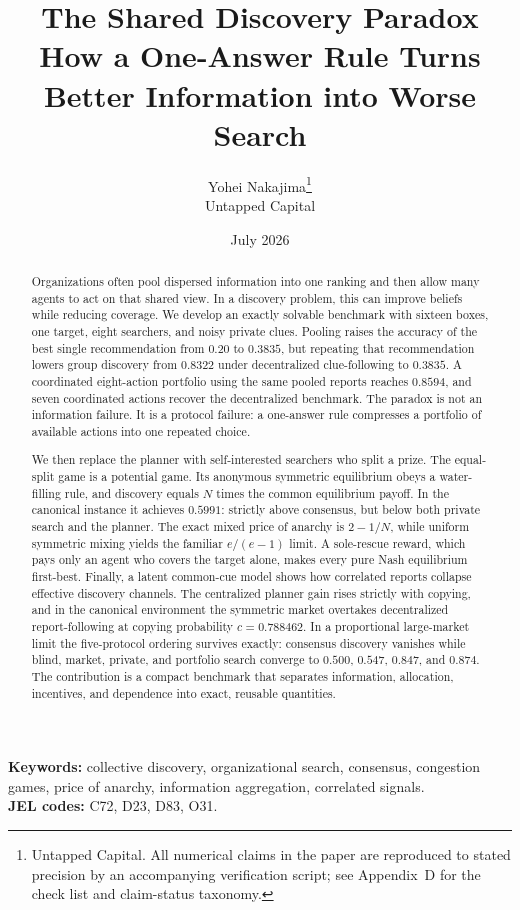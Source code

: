 \documentclass[11pt]{article}
\title{\textbf{The Shared Discovery Paradox}\\[0.35em]
\large How a One-Answer Rule Turns Better Information into Worse Search}
\author{Yohei Nakajima\thanks{Untapped Capital. All numerical claims in the paper are reproduced to stated precision by an accompanying verification script; see Appendix~D for the check list and claim-status taxonomy.}\\[2pt]
{\normalsize Untapped Capital}}
\date{July 2026}
\theoremstyle{definition}
\theoremstyle{remark}
\newcommand{\1}{\mathbf{1}}
\begin{document}
\maketitle
\vspace{-1.2em}

\begin{abstract}
Organizations often pool dispersed information into one ranking and then allow many agents to act on that shared view. In a discovery problem, this can improve beliefs while reducing coverage. We develop an exactly solvable benchmark with sixteen boxes, one target, eight searchers, and noisy private clues. Pooling raises the accuracy of the best single recommendation from $0.20$ to $0.3835$, but repeating that recommendation lowers group discovery from $0.8322$ under decentralized clue-following to $0.3835$. A coordinated eight-action portfolio using the same pooled reports reaches $0.8594$, and seven coordinated actions recover the decentralized benchmark. The paradox is not an information failure. It is a protocol failure: a one-answer rule compresses a portfolio of available actions into one repeated choice.

We then replace the planner with self-interested searchers who split a prize. The equal-split game is a potential game. Its anonymous symmetric equilibrium obeys a water-filling rule, and discovery equals $N$ times the common equilibrium payoff. In the canonical instance it achieves $0.5991$: strictly above consensus, but below both private search and the planner. The exact mixed price of anarchy is $2-1/N$, while uniform symmetric mixing yields the familiar $e/(e-1)$ limit. A sole-rescue reward, which pays only an agent who covers the target alone, makes every pure Nash equilibrium first-best. Finally, a latent common-cue model shows how correlated reports collapse effective discovery channels. The centralized planner gain rises strictly with copying, and in the canonical environment the symmetric market overtakes decentralized report-following at copying probability $c=0.788462$. In a proportional large-market limit the five-protocol ordering survives exactly: consensus discovery vanishes while blind, market, private, and portfolio search converge to $0.500$, $0.547$, $0.847$, and $0.874$. The contribution is a compact benchmark that separates information, allocation, incentives, and dependence into exact, reusable quantities.
\end{abstract}

\noindent\textbf{Keywords:} collective discovery, organizational search, consensus, congestion games, price of anarchy, information aggregation, correlated signals.\\
\textbf{JEL codes:} C72, D23, D83, O31.
\end{document}
